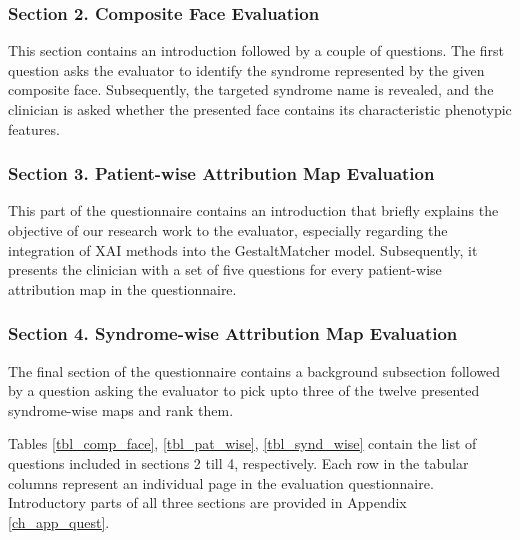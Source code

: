 \documentclass[../report.tex]{subfiles}
\begin{document}
    
   \subsubsection{Section 2. Composite Face Evaluation}
   This section contains an introduction followed by a couple of questions. The first question asks the evaluator to identify the syndrome represented by the given composite face. Subsequently, the targeted syndrome name is revealed, and the clinician is asked whether the presented face contains its characteristic phenotypic features.
    
   \subsubsection{Section 3. Patient-wise Attribution Map Evaluation}
   \raggedbottom
   This part of the questionnaire contains an introduction that briefly explains the objective of our research work to the evaluator, especially regarding the integration of XAI methods into the GestaltMatcher model. Subsequently, it presents the clinician with a set of five questions for every patient-wise attribution map in the questionnaire.
   \subsubsection{Section 4. Syndrome-wise Attribution Map Evaluation}
   The final section of the questionnaire contains a background subsection followed by a question asking the evaluator to pick upto three of the twelve presented syndrome-wise maps and rank them.
   
   Tables \ref{tbl_comp_face}, \ref{tbl_pat_wise}, \ref{tbl_synd_wise} contain the list of questions included in sections 2 till 4, respectively. Each row in the tabular columns represent an individual page in the evaluation questionnaire. Introductory parts of all three sections are provided in Appendix \ref{ch_app_quest}.
  
\end{document}
